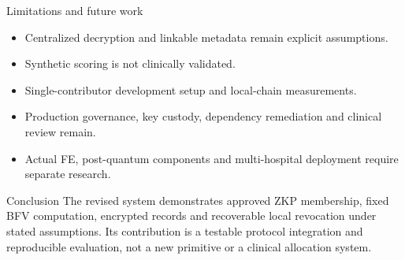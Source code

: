 \documentclass[10pt]{beamer}
\begin{document}
\begin{frame}{Limitations and future work}
\begin{itemize}
\item Centralized decryption and linkable metadata remain explicit assumptions.
\item Synthetic scoring is not clinically validated.
\item Single-contributor development setup and local-chain measurements.
\item Production governance, key custody, dependency remediation and clinical review remain.
\item Actual FE, post-quantum components and multi-hospital deployment require separate research.
\end{itemize}
\end{frame}
\begin{frame}{Conclusion}
The revised system demonstrates approved ZKP membership, fixed BFV computation, encrypted records and recoverable local revocation under stated assumptions.
\vspace{1em}
Its contribution is a testable protocol integration and reproducible evaluation, not a new primitive or a clinical allocation system.
\end{frame}
\end{document}
